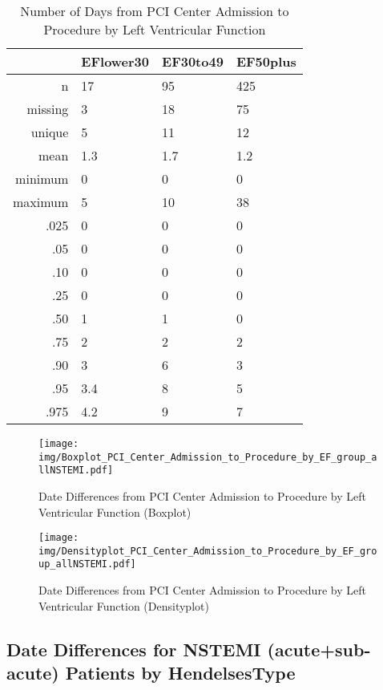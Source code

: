 \documentclass[a4paper]{report}
\begin{document}
\begin{itemize}
{%
\begin{table}[ht]
\centering
\begin{tabular}{rlll}
  \toprule
 & EFlower30 & EF30to49 & EF50plus \\ 
  \midrule
n & 17 & 95 & 425 \\ 
  missing & 3 & 18 & 75 \\ 
  unique & 5 & 11 & 12 \\ 
  mean & 1.3 & 1.7 & 1.2 \\ 
  minimum & 0 & 0 & 0 \\ 
  maximum & 5 & 10 & 38 \\ 
  .025 & 0 & 0 & 0 \\ 
  .05 & 0 & 0 & 0 \\ 
  .10 & 0 & 0 & 0 \\ 
  .25 & 0 & 0 & 0 \\ 
  .50 & 1 & 1 & 0 \\ 
  .75 & 2 & 2 & 2 \\ 
  .90 & 3 & 6 & 3 \\ 
  .95 & 3.4 & 8 & 5 \\ 
  .975 & 4.2 & 9 & 7 \\ 
   \bottomrule
\end{tabular}
\caption{Number of Days from PCI Center Admission to Procedure by Left Ventricular Function} 
\end{table}
\begin{figure}
  \centering
  \caption{Date Differences from PCI Center Admission to Procedure by Left Ventricular Function (Boxplot)}
  \label{Boxplot: Date Differences from PCI Center Admission to Procedure by Left Ventricular Function}
\texttt{[image: img/Boxplot\_PCI\_Center\_Admission\_to\_Procedure\_by\_EF\_group\_allNSTEMI.pdf]}\end{figure}


\begin{figure}
  \centering
  \caption{Date Differences from PCI Center Admission to Procedure by Left Ventricular Function (Densityplot)}
  \label{Density: Date Differences from PCI Center Admission to Procedure by Left Ventricular Function}
\texttt{[image: img/Densityplot\_PCI\_Center\_Admission\_to\_Procedure\_by\_EF\_group\_allNSTEMI.pdf]}\end{figure}




\clearpage
\subsection{Date Differences for NSTEMI (acute+sub-acute) Patients by HendelsesType}

}
\end{itemize}
\end{document}
